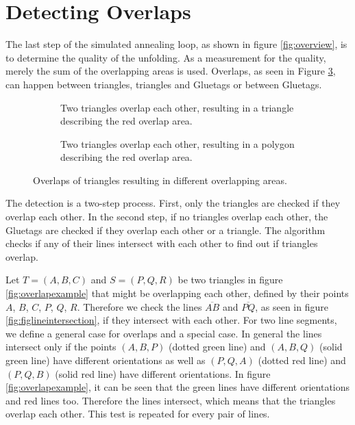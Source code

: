\documentclass[draft,final]{vutinfth} %
\begin{document}
\section{Detecting Overlaps}
\label{sec:overlaps}
The last step of the simulated annealing loop, as shown in figure \ref{fig:overview}, is to determine the quality of the unfolding. As a measurement for the quality, merely the sum of the overlapping areas is used. Overlaps, as seen in Figure \ref{fig:overlap}, can happen between triangles, triangles and Gluetags or between Gluetags. 

\begin{figure}
\centering
\begin{subfigure}[t]{.4\textwidth}
    
  \caption{Two triangles overlap each other, resulting in a triangle describing the red overlap area.}
    \label{fig:overlap1}
\end{subfigure}%
\hspace{.1\textwidth}
\begin{subfigure}[t]{.4\textwidth}
    
    \caption{Two triangles overlap each other, resulting in a polygon describing the red overlap area.}
    \label{fig:overlap2}
\end{subfigure}
\caption{Overlaps of triangles resulting in different overlapping areas.}
\label{fig:overlap}
\end{figure}

The detection is a two-step process. First, only the triangles are checked if they overlap each other. In the second step, if no triangles overlap each other, the Gluetags are checked if they overlap each other or a triangle. The algorithm checks if any of their lines intersect with each other to find out if triangles overlap.

Let $T = (A,B,C)$ and $S = (P,Q,R)$ be two triangles in figure \ref{fig:overlapexample} that might be overlapping each other, defined by their points $A$, $B$, $C$, $P$, $Q$, $R$. Therefore we check the lines $\overline{AB}$ and $\overline{PQ}$, as seen in figure \ref{fig:figlineintersection}, if they intersect with each other. For two line segments, we define a general case for overlaps and a special case. In general the lines intersect only if the points $(A,B,P)$ (dotted green line) and $(A,B,Q)$ (solid green line) have different orientations as well as $(P,Q,A)$ (dotted red line) and $(P,Q,B)$ (solid red line) have different orientations. In figure \ref{fig:overlapexample}, it can be seen that the green lines have different orientations and red lines too. Therefore the lines intersect, which means that the triangles overlap each other. This test is repeated for every pair of lines.
\end{document}
